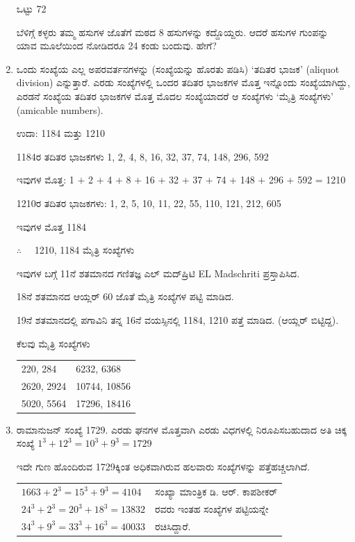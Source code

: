 \begin{enumerate}
ಒಟ್ಟು 72


ಬೆಳಿಗ್ಗೆ ಕಳ್ಳರು ತಮ್ಮ ಹಸುಗಳ ಜೊತೆಗೆ ಮಠದ 8 ಹಸುಗಳನ್ನು ಕದ್ದೊಯ್ದರು. ಆದರೆ ಹಸುಗಳ ಗುಂಪನ್ನು ಯಾವ ಮೂಲೆಯಿಂದ ನೋಡಿದರೂ 24 ಕಂಡು ಬಂದುವು. ಹೇಗೆ? 

\item ಒಂದು ಸಂಖ್ಯೆಯ ಎಲ್ಲ ಅಪರವರ್ತನಗಳನ್ನು (ಸಂಖ್ಯೆಯನ್ನು ಹೊರತು ಪಡಿಸಿ) `ತದಿತರ ಭಾಜಕ' (aliquot division) ಎನ್ನುತ್ತಾರೆ. ಎರಡು ಸಂಖ್ಯೆಗಳಲ್ಲಿ ಒಂದರ ತದಿತರ ಭಾಜಕಗಳ ಮೊತ್ತ ಇನ್ನೊಂದು ಸಂಖ್ಯೆಯಾಗಿದ್ದು, ಎರಡನೆ ಸಂಖ್ಯೆಯ ತದಿತರ ಭಾಜಕಗಳ ಮೊತ್ತ ಮೊದಲ ಸಂಖ್ಯೆಯಾದರೆ ಆ ಸಂಖ್ಯೆಗಳು `ಮೈತ್ರಿ ಸಂಖ್ಯೆಗಳು' (amicable numbers). 

ಉದಾ: 1184 ಮತ್ತು 1210

1184ರ ತದಿತರ ಭಾಜಕಗಳು 1, 2, 4, 8, 16, 32, 37, 74, 148, 296, 592

ಇವುಗಳ ಮೊತ್ತ: 1 $+$ 2 $+$ 4 $+$ 8 $+$ 16 $+$ 32 $+$ 37 $+$ 74 $+$ 148 $+$ 296 $+$ 592 = 1210

1210ರ ತದಿತರ ಭಾಜಕಗಳು: 1, 2, 5, 10, 11, 22, 55, 110, 121, 212, 605

ಇವುಗಳ ಮೊತ್ತ 1184 

$\therefore\quad$ 1210, 1184 ಮೈತ್ರಿ ಸಂಖ್ಯೆಗಳು 

ಇವುಗಳ ಬಗ್ಗೆ 11ನೆ ಶತಮಾನದ ಗಣಿತಜ್ಞ ಎಲ್ ಮದ್‌ಷ್ರಿಟಿ EL Madschriti ಪ್ರಸ್ತಾಪಿಸಿದ. 

18ನೆ ಶತಮಾನದ ಆಯ್ಲರ್ 60 ಜೊತೆ ಮೈತ್ರಿ ಸಂಖ್ಯೆಗಳ ಪಟ್ಟಿ ಮಾಡಿದ. 

19ನೆ ಶತಮಾನದಲ್ಲಿ ಪಗಾವಿನಿ ತನ್ನ 16ನೆ ವಯಸ್ಸಿನಲ್ಲಿ 1184, 1210 ಪತ್ತೆ ಮಾಡಿದ. (ಆಯ್ಲರ್ ಬಿಟ್ಟಿದ್ದ). 

ಕೆಲವು ಮೈತ್ರಿ ಸಂಖ್ಯೆಗಳು 

\begin{tabular}[t]{ll}
220, 284 & 6232, 6368\\
2620, 2924 & 10744, 10856\\
5020, 5564 & 17296, 18416
\end{tabular}

\item ರಾಮಾನುಜನ್ ಸಂಖ್ಯೆ  1729. ಎರಡು ಘನಗಳ ಮೊತ್ತವಾಗಿ ಎರಡು ವಿಧಗಳಲ್ಲಿ ನಿರೂಪಿಸಬಹುದಾದ ಅತಿ ಚಿಕ್ಕ ಸಂಖ್ಯೆ  $1^{3} + 12^{3} = 10^{3} + 9^{3} = 1729$

ಇದೇ ಗುಣ ಹೊಂದಿರುವ 1729ಕ್ಕಿಂತ ಅಧಿಕವಾಗಿರುವ ಹಲವಾರು ಸಂಖ್ಯೆಗಳನ್ನು ಪತ್ತೆಹಚ್ಚಲಾಗಿದೆ. 

\begin{tabular}[t]{ll}
$166{3} + 2^{3} = 15^{3} + 9^{3} = 4104$ & ಸಂಖ್ಯಾ ಮಾಂತ್ರಿಕ ಡಿ. ಆರ್. ಕಾಪಶೀಕರ್\\
$24^{3} + 2^{3} = 20^{3} + 18^{3} = 13832$& ರವರು ಇಂತಹ ಸಂಖ್ಯೆಗಳ ಪಟ್ಟಿಯನ್ನೇ\\
$34^{3} + 9^{3} = 33^{3} + 16^{3} = 40033$ & ರಚಿಸಿದ್ದಾರೆ. 
\end{tabular}


\end{enumerate}
